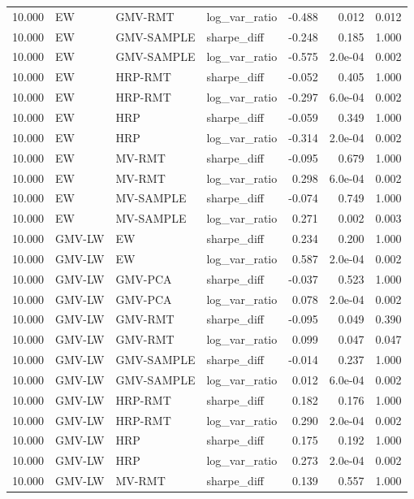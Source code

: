 \begin{table}[t]
{\begin{tabular}{rlllrrr}
10.000 & EW & GMV-RMT & log\_var\_ratio & -0.488 & 0.012 & 0.012 \\
10.000 & EW & GMV-SAMPLE & sharpe\_diff & -0.248 & 0.185 & 1.000 \\
10.000 & EW & GMV-SAMPLE & log\_var\_ratio & -0.575 & 2.0e-04 & 0.002 \\
10.000 & EW & HRP-RMT & sharpe\_diff & -0.052 & 0.405 & 1.000 \\
10.000 & EW & HRP-RMT & log\_var\_ratio & -0.297 & 6.0e-04 & 0.002 \\
10.000 & EW & HRP & sharpe\_diff & -0.059 & 0.349 & 1.000 \\
10.000 & EW & HRP & log\_var\_ratio & -0.314 & 2.0e-04 & 0.002 \\
10.000 & EW & MV-RMT & sharpe\_diff & -0.095 & 0.679 & 1.000 \\
10.000 & EW & MV-RMT & log\_var\_ratio & 0.298 & 6.0e-04 & 0.002 \\
10.000 & EW & MV-SAMPLE & sharpe\_diff & -0.074 & 0.749 & 1.000 \\
10.000 & EW & MV-SAMPLE & log\_var\_ratio & 0.271 & 0.002 & 0.003 \\
10.000 & GMV-LW & EW & sharpe\_diff & 0.234 & 0.200 & 1.000 \\
10.000 & GMV-LW & EW & log\_var\_ratio & 0.587 & 2.0e-04 & 0.002 \\
10.000 & GMV-LW & GMV-PCA & sharpe\_diff & -0.037 & 0.523 & 1.000 \\
10.000 & GMV-LW & GMV-PCA & log\_var\_ratio & 0.078 & 2.0e-04 & 0.002 \\
10.000 & GMV-LW & GMV-RMT & sharpe\_diff & -0.095 & 0.049 & 0.390 \\
10.000 & GMV-LW & GMV-RMT & log\_var\_ratio & 0.099 & 0.047 & 0.047 \\
10.000 & GMV-LW & GMV-SAMPLE & sharpe\_diff & -0.014 & 0.237 & 1.000 \\
10.000 & GMV-LW & GMV-SAMPLE & log\_var\_ratio & 0.012 & 6.0e-04 & 0.002 \\
10.000 & GMV-LW & HRP-RMT & sharpe\_diff & 0.182 & 0.176 & 1.000 \\
10.000 & GMV-LW & HRP-RMT & log\_var\_ratio & 0.290 & 2.0e-04 & 0.002 \\
10.000 & GMV-LW & HRP & sharpe\_diff & 0.175 & 0.192 & 1.000 \\
10.000 & GMV-LW & HRP & log\_var\_ratio & 0.273 & 2.0e-04 & 0.002 \\
10.000 & GMV-LW & MV-RMT & sharpe\_diff & 0.139 & 0.557 & 1.000 \\

\end{tabular}}
\end{table}
